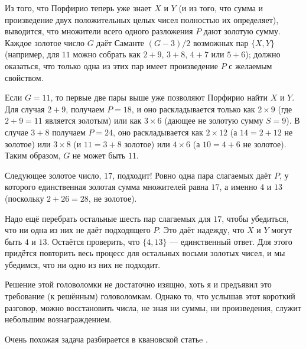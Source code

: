 Из того, что Порфирио теперь уже знает $X$ и $Y$ (и из того, что сумма и произведение двух положительных целых чисел полностью их определяет), выводится, что множители всего одного разложения $P$ дают золотую сумму. 
Каждое золотое число $G$ даёт Саманте $(G - 3)/2$ возможных пар $\{X, Y\}$
(например, для $11$ можно собрать как $2 + 9$, $3 + 8$, $4 + 7$ или $5 + 6$); должно оказаться, что только одна из этих пар имеет произведение $P$ с желаемым свойством.

Если $G = 11$, то первые две пары выше уже позволяют Порфирио найти $X$ и $Y$.
Для случая $2 + 9$, получаем $P = 18$, и оно раскладывается только как $2 \times 9$ (где $2 + 9 = 11$ является золотым) или как $3 \times 6$ (дающее не золотую сумму $S = 9$).
В случае $3 + 8$ получаем $P = 24$, оно раскладывается как $2 \times 12$ (а $14=2+12$ не золотое) или
$3 \times 8$ (и $11=3+8$ золотое) или $4 \times 6$ (а $10=4+6$ не золотое).
Таким образом, $G$ не может быть $11$.

Следующее золотое число, $17$, подходит!
Ровно одна пара слагаемых даёт $P$, у которого единственная золотая сумма множителей равна $17$, а именно $4$ и $13$ (поскольку $2 + 26 = 28$, не золотое).

Надо ещё перебрать остальные шесть пар слагаемых для $17$, чтобы убедиться, что ни одна из них не даёт подходящего $P$.
Это даёт надежду, что $X$ и $Y$ могут быть $4$ и $13$.
Остаётся проверить, что $\{4, 13\}$ --- единственный ответ.
Для этого придётся повторить весь процесс для остальных восьми золотых чисел, и мы убедимся, что ни одно из них не подходит.

Решение этой головоломки не достаточно изящно,
хоть я и предъявил это требование (к решённым) головоломкам.
Однако то, что услышав этот короткий разговор, можно восстановить числа, не зная ни суммы, ни произведения, служит небольшим вознаграждением.

\begin{addedbytheeditors}
Очень похожая задача разбирается в квановской статьe \cite{artemov-gimatov-fedorov}.\pr



\end{addedbytheeditors}

